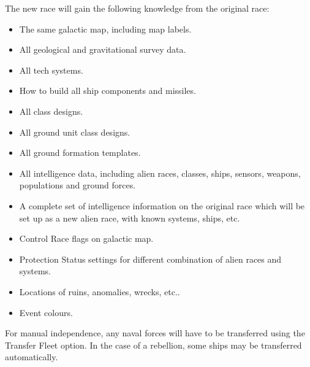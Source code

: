 \documentclass[../../Aurora C# unofficial manual.tex]{subfiles}
\begin{document}
	
	The new race will gain the following knowledge from the original race:
	\begin{itemize}
		\item The same galactic map, including map labels.
		\item All geological and gravitational survey data.
		\item All tech systems.
		\item How to build all ship components and missiles.
		\item All class designs.
		\item All ground unit class designs.
		\item All ground formation templates.
		\item All intelligence data, including alien races, classes, ships, sensors, weapons, populations and ground forces.
		\item A complete set of intelligence information on the original race which will be set up as a new alien race, with known systems, ships, etc.
		\item Control Race flags on galactic map.
		\item Protection Status settings for different combination of alien races and systems.
		\item Locations of ruins, anomalies, wrecks, etc..
		\item Event colours.
	\end{itemize}
	
	For manual independence, any naval forces will have to be transferred using the Transfer Fleet option. In the case of a rebellion, some ships may be transferred automatically.
\end{document}
